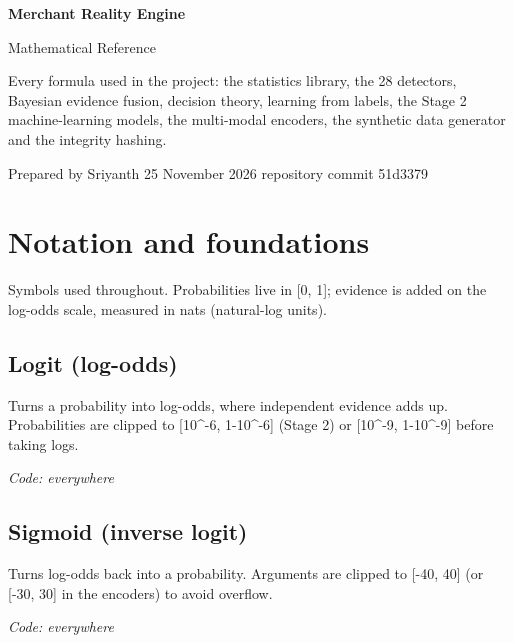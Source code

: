 \documentclass[11pt,a4paper]{article}
\newcommand{\where}[1]{\par{\small\itshape\color{mute}Code: #1}\par}
\begin{document}
\begin{titlepage}\centering\vspace*{55mm}
{\Huge\bfseries Merchant Reality Engine\par}\vspace{4mm}
{\Large\color{mute} Mathematical Reference\par}\vspace{10mm}
{\large\color{mute} Every formula used in the project: the statistics library, the 28 detectors, Bayesian evidence fusion,
decision theory, learning from labels, the Stage 2 machine-learning models, the multi-modal encoders,
the synthetic data generator and the integrity hashing.\par}\vspace{14mm}
{\color{mute} Prepared by Sriyanth \textperiodcentered{} 25 November 2026 \textperiodcentered{} repository commit 51d3379\par}
\end{titlepage}
\tableofcontents\clearpage

\section{Notation and foundations}
{\color{mute}Symbols used throughout. Probabilities live in [0, 1]; evidence is added on the log-odds scale, measured in nats (natural-log units).}

\subsection*{Logit (log-odds)}
\par\smallskip\noindent{}\par\smallskip
Turns a probability into log-odds, where independent evidence adds up. Probabilities are clipped to [10\textasciicircum{}-6, 1-10\textasciicircum{}-6] (Stage 2) or [10\textasciicircum{}-9, 1-10\textasciicircum{}-9] before taking logs.
\where{everywhere}

\subsection*{Sigmoid (inverse logit)}
\par\smallskip\noindent{}\par\smallskip
Turns log-odds back into a probability. Arguments are clipped to [-40, 40] (or [-30, 30] in the encoders) to avoid overflow.
\where{everywhere}
\end{document}
